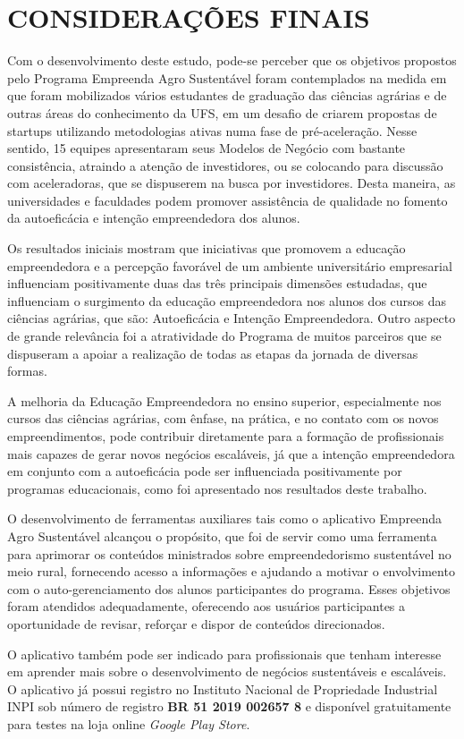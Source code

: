 \chapter{CONSIDERAÇÕES FINAIS}


Com o desenvolvimento deste estudo, pode-se perceber que os objetivos propostos pelo Programa Empreenda Agro Sustentável foram contemplados na medida em que foram mobilizados vários estudantes de graduação das ciências agrárias e de outras áreas do conhecimento da UFS, em um desafio de criarem propostas de startups utilizando metodologias ativas numa fase de pré-aceleração. Nesse sentido, 15 equipes apresentaram seus Modelos de Negócio com bastante consistência, atraindo a atenção de investidores, ou se colocando para discussão com aceleradoras, que se dispuserem na busca por investidores. Desta maneira, as universidades e faculdades podem promover assistência de qualidade no fomento da autoeficácia e intenção empreendedora dos alunos.

Os resultados iniciais mostram que iniciativas que promovem a educação empreendedora e a percepção favorável de um ambiente universitário empresarial influenciam positivamente duas das três principais dimensões estudadas, que influenciam o surgimento da educação empreendedora nos alunos dos cursos das ciências agrárias, que são: Autoeficácia e Intenção Empreendedora. Outro aspecto de grande relevância foi a atratividade do Programa de muitos parceiros que se dispuseram a apoiar a realização de todas as etapas da jornada de diversas formas.

A melhoria da Educação Empreendedora no ensino superior, especialmente nos cursos das ciências agrárias, com ênfase, na prática, e no contato com os novos empreendimentos, pode contribuir diretamente para a formação de profissionais mais capazes de gerar novos negócios escaláveis, já que a intenção empreendedora em conjunto com a autoeficácia pode ser influenciada positivamente por programas educacionais, como foi apresentado nos resultados deste trabalho.

O desenvolvimento de ferramentas auxiliares tais como o aplicativo Empreenda Agro Sustentável alcançou o propósito, que foi de servir como uma ferramenta para aprimorar os conteúdos ministrados sobre empreendedorismo sustentável no meio rural, fornecendo acesso a informações e ajudando a motivar o envolvimento com o auto-gerenciamento dos alunos participantes do programa. Esses objetivos foram atendidos adequadamente, oferecendo aos usuários participantes a oportunidade de revisar, reforçar e dispor de conteúdos direcionados.

O aplicativo também pode ser indicado para profissionais que tenham interesse em aprender mais sobre o desenvolvimento de negócios sustentáveis e escaláveis. O aplicativo já possui registro no Instituto Nacional de Propriedade Industrial INPI sob número de registro \textbf{BR 51 2019 002657 8} e disponível gratuitamente para testes na loja online \textit{Google Play Store}.

